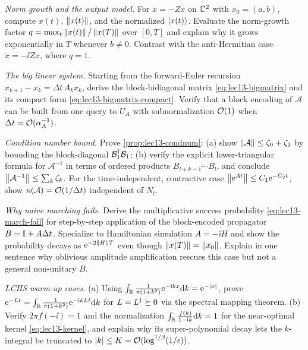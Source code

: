 \begin{exercise}\label{ex:lec13-2}
\emph{Norm growth and the output model.} For $\dot x=-Zx$ on $\mathbb{C}^2$ with $x_0=(a,b)$, compute
$x(t)$, $\left\lVert x(t) \right\rVert$, and the normalized $\ket{x(t)}$. Evaluate the norm-growth factor
$q=\max_t\left\lVert x(t) \right\rVert/\left\lVert x(T) \right\rVert$ over $[0,T]$ and explain why it grows exponentially in $T$
whenever $b\ne0$. Contrast with the anti-Hermitian case $\dot x=-\ii Zx$, where $q=1$.
\end{exercise}

\begin{exercise}\label{ex:lec13-3}
\emph{The big linear system.} Starting from the forward-Euler recursion $x_{k+1}-x_k=\Delta t\,
A_k x_k$, derive the block-bidiagonal matrix \eqref{eq:lec13-bigmatrix} and its compact form
\eqref{eq:lec13-bigmatrix-compact}. Verify that a block encoding of $\mathcal A$ can be built
from one query to $U_A$ with subnormalization $\mathcal{O}(1)$ when $\Delta t=\mathcal{O}(\alpha_A^{-1})$.
\end{exercise}

\begin{exercise}\label{ex:lec13-4}
\emph{Condition number bound.} Prove \cref{prop:lec13-condnum}: (a) show $\left\lVert \mathcal A \right\rVert\le
\zeta_0+\zeta_1$ by bounding the block-diagonal $\mathcal B_1^{\dagger}\mathcal B_1$; (b) verify the
explicit lower-triangular formula for $\mathcal A^{-1}$ in terms of ordered products $B_{l+k-1}
\cdots B_l$, and conclude $\left\lVert \mathcal A^{-1} \right\rVert\le\sum_k\zeta_k$. For the time-independent,
contractive case $\left\lVert \mathrm{e}^{At} \right\rVert\le C_1\mathrm{e}^{-C_2 t}$, show $\kappa(\mathcal A)=\mathcal{O}(1/\Delta t)$
independent of $N_t$.
\end{exercise}

\begin{exercise}\label{ex:lec13-5}
\emph{Why naive marching fails.} Derive the multiplicative success probability
\eqref{eq:lec13-march-fail} for step-by-step application of the block-encoded propagator
$B=\mathbb{I}+A\Delta t$. Specialize to Hamiltonian simulation $A=-\ii H$ and show the probability
decays as $\mathrm{e}^{-2\left\lVert H \right\rVert T}$ even though $\left\lVert x(T) \right\rVert=\left\lVert x_0 \right\rVert$. Explain in one sentence why
oblivious amplitude amplification rescues this case but not a general non-unitary $B$.
\end{exercise}

\begin{exercise}\label{ex:lec13-6}
\emph{LCHS warm-up cases.} (a) Using $\int_{\mathbb{R}}\frac{1}{\pi(1+k^2)}\mathrm{e}^{-\mathrm{i} kx}\mathrm{d} k=\mathrm{e}^{-\left\lvert x \right\rvert}$,
prove $\mathrm{e}^{-Lt}=\int_{\mathbb{R}}\frac{1}{\pi(1+k^2)}\mathrm{e}^{-\mathrm{i} kLt}\mathrm{d} k$ for $L=L^{\dagger}\succeq0$ via the
spectral mapping theorem. (b) Verify $2\pi f(-\ii)=1$ and the normalization $\int_{\mathbb{R}}\frac{f(k)}
{1-\mathrm{i} k}\mathrm{d} k=1$ for the near-optimal kernel \eqref{eq:lec13-kernel}, and explain why its
super-polynomial decay lets the $k$-integral be truncated to $\left\lvert k \right\rvert\le K=\mathcal{O}(\log^{1/\beta}
(1/\epsilon))$.
\end{exercise}

